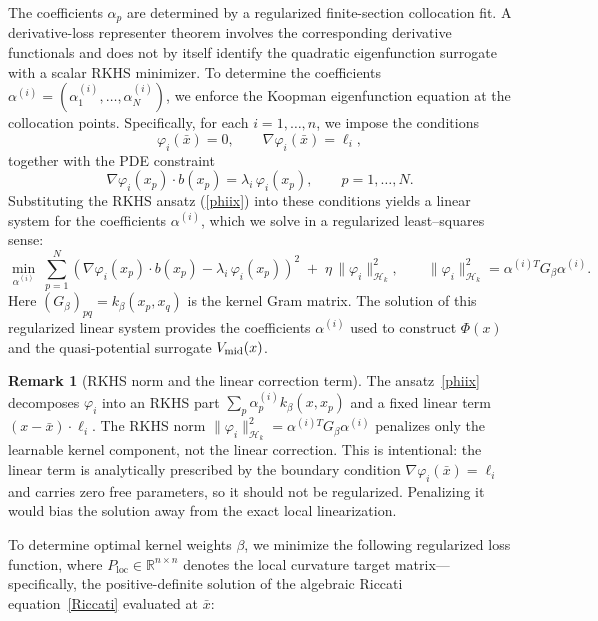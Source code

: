 \documentclass[11pt]{article}
\theoremstyle{plain}      %
\theoremstyle{definition} %
\newtheorem{remark}[theorem]{Remark}
\begin{document}
The coefficients $\alpha_p$ are determined by a regularized finite-section collocation fit. A derivative-loss representer theorem involves the corresponding derivative functionals and does not by itself identify the quadratic eigenfunction surrogate with a scalar RKHS minimizer.   
To determine the coefficients $\alpha^{(i)} = (\alpha^{(i)}_1,\dots,\alpha^{(i)}_N)$,
we enforce the Koopman eigenfunction equation at the collocation points.
Specifically, for each $i=1,\dots,n$, we impose the conditions
\[
\varphi_i(\bar x)=0, \qquad
\nabla\varphi_i(\bar x)=\ell_i,
\]
together with the PDE constraint
\[
\nabla\varphi_i(x_p)\cdot b(x_p)
= \lambda_i\,\varphi_i(x_p),
\qquad p=1,\dots,N.
\]
Substituting the RKHS ansatz (\ref{phiix}) into these conditions yields a linear
system for the coefficients $\alpha^{(i)}$, which we solve in a
regularized least--squares sense:
\begin{equation}
    \label{eqn:alpha_eqn}
\min_{\alpha^{(i)}} \;
\sum_{p=1}^N 
\left(
\nabla\varphi_i(x_p)\cdot b(x_p)
- \lambda_i\,\varphi_i(x_p)
\right)^2
\;+\;
\eta\,\|\varphi_i\|_{\mathcal{H}_k}^2,
\qquad 
\|\varphi_i\|_{\mathcal H_k}^2
= \alpha^{(i)T} G_\beta \alpha^{(i)}.
\end{equation}
Here $(G_\beta)_{pq}=k_\beta(x_p,x_q)$ is the kernel Gram matrix.
The solution of this regularized linear system provides the coefficients
$\alpha^{(i)}$ used to construct $\Phi(x)$ and the quasi-potential
surrogate $V_{\rm mid}(x)$.


\begin{remark}[RKHS norm and the linear correction term]
The ansatz~\eqref{phiix} decomposes $\varphi_i$ into an RKHS part $\sum_p \alpha_p^{(i)} k_\beta(x,x_p)$ and a fixed linear term $(x-\bar{x})\cdot\ell_i$. The RKHS norm $\|\varphi_i\|_{\mathcal{H}_k}^2 = \alpha^{(i)T}G_\beta\alpha^{(i)}$ penalizes only the learnable kernel component, not the linear correction. This is intentional: the linear term is analytically prescribed by the boundary condition $\nabla\varphi_i(\bar{x})=\ell_i$ and carries zero free parameters, so it should not be regularized. Penalizing it would bias the solution away from the exact local linearization.
\end{remark}


To determine optimal kernel weights \( \beta \), we minimize the following regularized loss function, where $P_{\text{loc}} \in \mathbb{R}^{n \times n}$ denotes the local curvature target matrix---specifically, the positive-definite solution of the algebraic Riccati equation~\eqref{Riccati} evaluated at $\bar{x}$:
\end{document}
